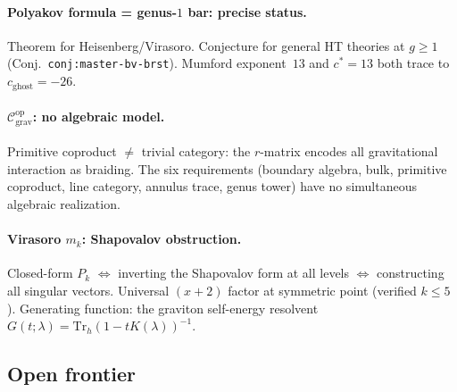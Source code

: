 \documentclass[11pt]{article}
\newcommand{\cC}{\mathcal{C}}
\begin{document}
\paragraph{Polyakov formula = genus-$1$ bar: precise status.}
Theorem for Heisenberg/Virasoro.  Conjecture for general HT
theories at $g \ge 1$ (Conj.\ \texttt{conj:master-bv-brst}).
Mumford exponent~$13$ and $c^* = 13$ both trace to
$c_{\mathrm{ghost}} = -26$.

\paragraph{$\cC_{\mathrm{grav}}^{\mathrm{op}}$: no algebraic model.}
Primitive coproduct $\ne$ trivial category: the $r$-matrix encodes
all gravitational interaction as braiding.  The six requirements
(boundary algebra, bulk, primitive coproduct, line category, annulus
trace, genus tower) have no simultaneous algebraic realization.

\paragraph{Virasoro $m_k$: Shapovalov obstruction.}
Closed-form $P_k$ $\Leftrightarrow$ inverting the Shapovalov form
at all levels $\Leftrightarrow$ constructing all singular vectors.
Universal $(x+2)$ factor at symmetric point (verified $k \le 5$).
Generating function: the graviton self-energy resolvent
$G(t;\lambda) = \mathrm{Tr}_h(1 - tK(\lambda))^{-1}$.

\subsection{Open frontier}
\label{subsec:polyakov-frontier}
\end{document}

